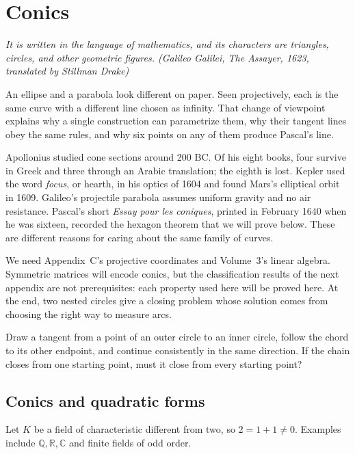 \chapter{Conics}\label{geometry:ch:conics}

\begin{center}\itshape
It is written in the language of mathematics, and its characters are triangles, circles, and other geometric figures.
\upshape(Galileo Galilei, \emph{The Assayer}, 1623, translated by Stillman Drake)
\end{center}

An ellipse and a parabola look different on paper. Seen projectively, each is the same curve with a different line chosen as infinity. That change of viewpoint explains why a single construction can parametrize them, why their tangent lines obey the same rules, and why six points on any of them produce Pascal's line.

Apollonius studied cone sections around 200 BC. Of his eight books, four survive in Greek and three through an Arabic translation; the eighth is lost. Kepler used the word \emph{focus}, or hearth, in his optics of 1604 and found Mars's elliptical orbit in 1609. Galileo's projectile parabola assumes uniform gravity and no air resistance. Pascal's short \emph{Essay pour les coniques}, printed in February 1640 when he was sixteen, recorded the hexagon theorem that we will prove below. These are different reasons for caring about the same family of curves.

We need Appendix~C's projective coordinates and Volume~3's linear algebra. Symmetric matrices will encode conics, but the classification results of the next appendix are not prerequisites: each property used here will be proved here. At the end, two nested circles give a closing problem whose solution comes from choosing the right way to measure arcs.

\begin{think}
Draw a tangent from a point of an outer circle to an inner circle, follow the chord to its other endpoint, and continue consistently in the same direction. If the chain closes from one starting point, must it close from every starting point?
\end{think}

\section{Conics and quadratic forms}

Let $K$ be a field of characteristic different from two, so $2=1+1\ne0$. Examples include $\mathbb Q,\mathbb R,\mathbb C$ and finite fields of odd order.

